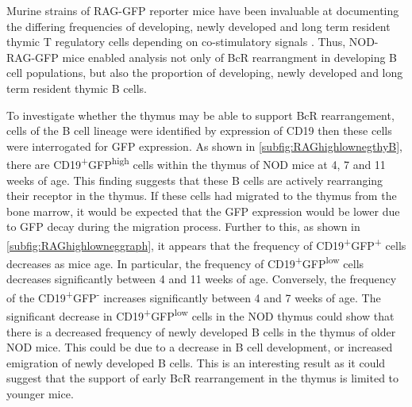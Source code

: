 Murine strains of RAG-GFP reporter mice have been invaluable at documenting the differing frequencies of developing, newly developed and long term resident thymic T regulatory cells depending on co-stimulatory signals \citep{Cuss2012}.
Thus, NOD-RAG-GFP mice enabled analysis not only of BcR rearrangment in developing B cell populations, but also the proportion of developing, newly developed and long term resident thymic B cells.

To investigate whether the thymus may be able to support BcR rearrangement, cells of the B cell lineage were identified by expression of CD19 then these cells were interrogated for GFP expression.
As shown in \cref{subfig:RAGhighlownegthyB}, there are CD19\textsuperscript{+}GFP\textsuperscript{high} cells within the thymus of NOD mice at 4, 7 and 11 weeks of age.
This finding suggests that these B cells are actively rearranging their receptor in the thymus.
If these cells had migrated to the thymus from the bone marrow, it would be expected that the GFP expression would be lower due to GFP decay during the migration process.
Further to this, as shown in \cref{subfig:RAGhighlowneggraph}, it appears that the frequency of CD19\textsuperscript{+}GFP\textsuperscript{+} cells decreases as mice age.
In particular, the frequency of CD19\textsuperscript{+}GFP\textsuperscript{low} cells decreases significantly between 4 and 11 weeks of age.
Conversely, the frequency of the CD19\textsuperscript{+}GFP\textsuperscript{-} increases significantly between 4 and 7 weeks of age.
The significant decrease in CD19\textsuperscript{+}GFP\textsuperscript{low} cells in the NOD thymus could show that there is a decreased frequency of newly developed B cells in the thymus of older NOD mice.
This could be due to a decrease in B cell development, or increased emigration of newly developed B cells.
This is an interesting result as it could suggest that the support of early BcR rearrangement in the thymus is limited to younger mice.



